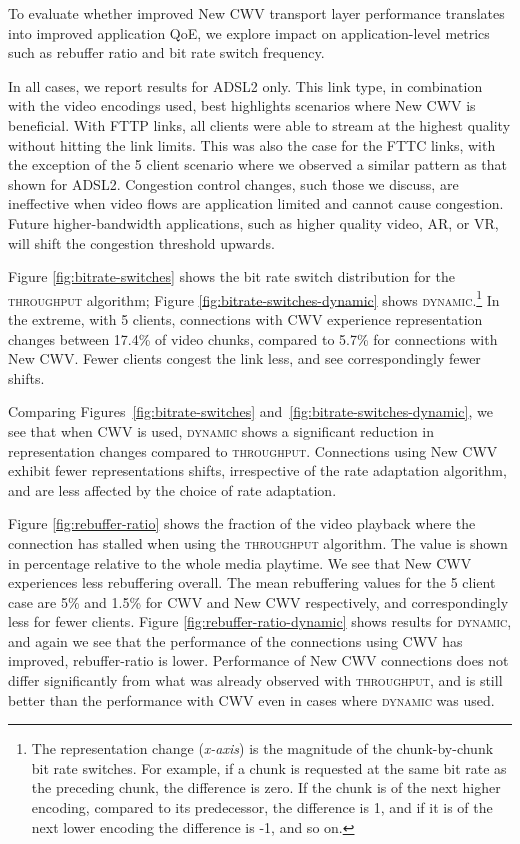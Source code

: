 \documentclass[10pt,sigconf]{acmart}
\begin{document}
To evaluate whether improved New CWV transport layer performance translates into improved application QoE, we explore impact on application-level metrics such as rebuffer ratio and bit rate switch frequency. 

In all cases, we report results for ADSL2 only. This link type, in combination with the video encodings used, best highlights scenarios where New CWV is beneficial. With FTTP links, all clients were able to stream at the highest quality without hitting the link limits. This was also the case for the FTTC links, with the exception of the 5 client scenario where we observed a similar pattern as that shown for ADSL2. Congestion control changes, such those we discuss, are ineffective when video flows are application limited and cannot cause congestion. Future higher-bandwidth applications, such as higher quality video, AR, or VR, will shift the congestion threshold upwards.

Figure \ref{fig:bitrate-switches} shows the bit rate switch distribution for the \textsc{throughput} algorithm; Figure \ref{fig:bitrate-switches-dynamic} shows \textsc{dynamic}.\footnote{The representation change (\emph{x-axis}) is the magnitude of the chunk-by-chunk bit rate switches. For example, if a chunk is requested at the same bit rate as the preceding chunk, the difference is zero. If the chunk is of the next higher encoding, compared to its predecessor, the difference is 1, and if it is of the next lower encoding the difference is -1, and so on.} 
In the extreme, with 5 clients, connections with CWV experience representation changes between 17.4\% of video chunks, compared to 5.7\% for connections with New CWV. Fewer clients congest the link less, and see correspondingly fewer shifts.


Comparing Figures~\ref{fig:bitrate-switches} and~\ref{fig:bitrate-switches-dynamic}, we see that when CWV is used, \textsc{dynamic} shows a significant reduction in representation changes compared to \textsc{throughput}. Connections using New CWV exhibit fewer representations shifts, irrespective of the rate adaptation algorithm, and are less affected by the choice of rate adaptation.


Figure \ref{fig:rebuffer-ratio} shows the fraction of the video playback where the connection has stalled when using the \textsc{throughput} algorithm. The value is shown in percentage relative to the whole media playtime. We see that New CWV experiences less rebuffering overall. The mean rebuffering values for the 5 client case are 5\% and 1.5\% for CWV and New CWV respectively, and correspondingly less for fewer clients. 
Figure \ref{fig:rebuffer-ratio-dynamic} shows results for \textsc{dynamic}, and again we see that the performance of the connections using CWV has improved, rebuffer-ratio is lower. Performance of New CWV connections does not differ significantly from what was already observed with \textsc{throughput}, and is still better than the performance with CWV even in cases where \textsc{dynamic} was used.
\end{document}
